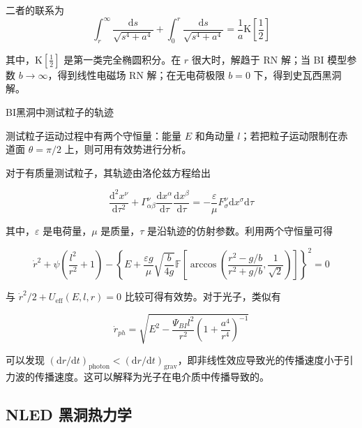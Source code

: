 \documentclass[9pt, dvipsnames]{beamer} %
\begin{document}
\begin{frame}
    二者的联系为
$$
\int_r ^{\infty} \frac{\mathrm{d}s }{\sqrt{s^4+a^4} } + \int_0^r \frac{\mathrm{d}s }{\sqrt{s^4+a^4} } 
=\frac{1 }{a } \mathrm{K}\left[\frac{1 }{2 }  \right] 
$$

其中，$\mathrm{K}\left[\frac{1 }{2 } \right]$ 是第一类完全椭圆积分。在 $r$ 很大时，解趋于 RN 解；当 BI 模型参数 $b\to\infty$，得到线性电磁场 RN 解；在无电荷极限 $b=0$ 下，得到史瓦西黑洞解。

\end{frame}

\begin{frame}{BI黑洞中测试粒子的轨迹}

    测试粒子运动过程中有两个守恒量：能量 $E$ 和角动量 $l$；若把粒子运动限制在赤道面 $\theta=\pi/2$ 上，则可用有效势进行分析。

    对于有质量测试粒子，其轨迹由洛伦兹方程给出

    $$
    \frac{\mathrm{d}^2 x^\nu }{\mathrm{d}\tau^2 } + \Gamma_{\alpha\beta}^\nu \frac{\mathrm{d}x^\alpha }{\mathrm{d}\tau } \frac{\mathrm{d}x^\beta }{\mathrm{d}\tau } 
    =-\frac{\varepsilon }{\mu } F_{\sigma}^{\nu} \mathrm{d}x^\sigma \mathrm{d}\tau
    $$

    其中，$\varepsilon$ 是电荷量，$\mu$ 是质量，$\tau$ 是沿轨迹的仿射参数。利用两个守恒量可得

    $$
    \dot{r}^2 + \psi\left(\frac{l^2 }{r^2 } + 1 \right) - \left\{E+\frac{\varepsilon g }{\mu } \sqrt{\frac{b }{4g } } \mathbb{F} \left[\arccos\left(\frac{r^2-g/b }{r^2+g/b }  , \frac{1 }{\sqrt{2} }  \right) \right] \right\}^2=0
    $$

    与 $\dot{r}^2/2+U_{\mathrm{eff}}(E,l,r)=0$ 比较可得有效势。对于光子，类似有

    $$
    \dot{r}_{ph}
    =\sqrt{E^2 - \frac{\Psi_{BI} l^2 }{r^2 } \left(1+\frac{a^4 }{r^4 }  \right)^{-1}} 
    $$

    可以发现 $(\mathrm{d}r/\mathrm{d}t)_{\mathrm{photon}}<(\mathrm{d}r/\mathrm{d}t)_{\mathrm{grav}}$，即非线性效应导致光的传播速度小于引力波的传播速度。这可以解释为光子在电介质中传播导致的。
    
\end{frame}

\subsection{NLED 黑洞热力学}
\end{document}
